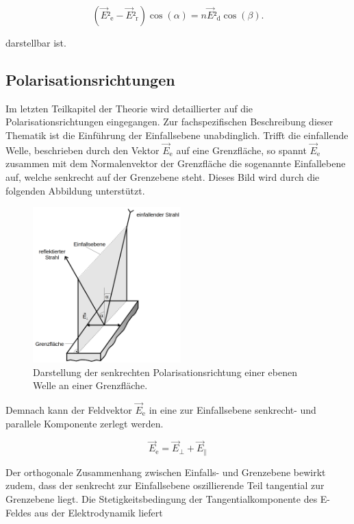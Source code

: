 \begin{equation}
    \left(\vec{E}²_\text{e} - \vec{E}²_\text{r}\right)\cos(\alpha) = n\vec{E}²_\text{d}\cos(\beta).
\end{equation}

\noindent darstellbar ist. 

\subsection{Polarisationsrichtungen}
\label{sec:Polarisationsrichtungen}

Im letzten Teilkapitel der Theorie wird detaillierter auf die Polarisationsrichtungen eingegangen. Zur fachspezifischen Beschreibung dieser Thematik ist die Einführung der Einfallsebene 
unabdinglich. Trifft die einfallende Welle, beschrieben durch den Vektor $\vec{E}_\text{e}$ auf eine Grenzfläche, so spannt $\vec{E}_\text{e}$ zusammen mit dem Normalenvektor der Grenzfläche
die sogenannte Einfallebene auf, welche senkrecht auf der Grenzebene steht. Dieses Bild wird durch die folgenden Abbildung unterstützt.

\begin{figure}[H]
    \centering
    \includegraphics[height=6cm]{Einfallsebene.png}
    \caption{Darstellung der senkrechten Polarisationsrichtung einer ebenen Welle an einer Grenzfläche\cite{Versuchsanleitung_v407}.}
    \label{fig:SkizzePolarisationsrichtung}
\end{figure}

\noindent Demnach kann der Feldvektor $\vec{E}_\text{e}$ in eine zur Einfallsebene senkrecht- und parallele Komponente zerlegt werden.

\begin{equation*}
    \vec{E}_\text{e} = \vec{E}_\perp + \vec{E}_\parallel
\end{equation*}

\noindent Der orthogonale Zusammenhang zwischen Einfalls- und Grenzebene bewirkt zudem, dass der senkrecht zur Einfallsebene oszillierende Teil 
tangential zur Grenzebene liegt. Die Stetigkeitsbedingung der Tangentialkomponente des E-Feldes aus der Elektrodynamik liefert 

